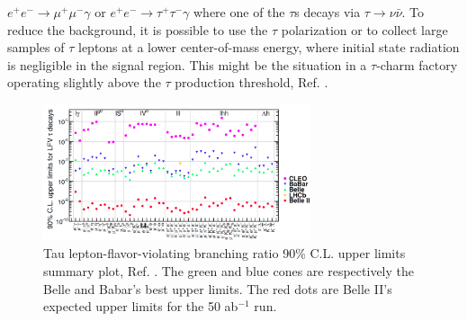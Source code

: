 $e^+ e^- \rightarrow \mu^+ \mu^- \gamma$ or $e^+ e^- \rightarrow \tau^+ \tau^- \gamma$ where one of the $\tau$s decays via $\tau \rightarrow \nu \bar{\nu}$.
To reduce the background, it is possible to use the $\tau$ polarization or to collect large samples of
$\tau$ leptons at a lower center-of-mass energy, where initial state radiation is negligible in the signal region. This might be the situation in a $\tau$-charm 
factory operating slightly above the $\tau$ production threshold, Ref. \cite{Bennett_2016}.
\begin{figure}[!h]
\centering
\includegraphics[width =0.7\textwidth]{figures/png/Screenshot_20240319_134052.png}
\caption{Tau lepton-flavor-violating branching ratio 90\% C.L. upper limits summary plot, Ref. \cite{universe4100101}. The green and blue cones 
are respectively the Belle and Babar's best upper limits. The red dots are Belle II's expected upper limits for the 50 ab$^{-1}$ run.}
\label{fig:tauchannel}
\end{figure}

